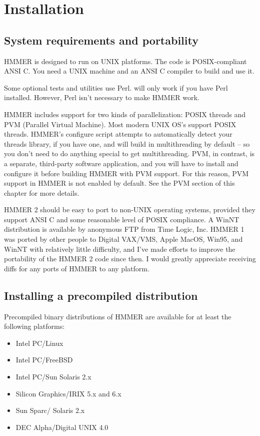 \chapter{Installation}

\section{System requirements and portability}

HMMER is designed to run on UNIX platforms. The code is
POSIX-compliant ANSI C.  You need a UNIX machine and an ANSI C
compiler to build and use it.

Some optional tests and utilities use Perl.  will only
work if you have Perl installed. However, Perl isn't necessary to make
HMMER work.

HMMER includes support for two kinds of parallelization: POSIX threads
and PVM (Parallel Virtual Machine). Most modern UNIX OS's support
POSIX threads. HMMER's configure script attempts to automatically
detect your threads library, if you have one, and will build in
multithreading by default -- so you don't need to do anything special
to get multithreading. PVM, in contrast, is a separate, third-party
software application, and you will have to install and configure it
before building HMMER with PVM support. For this reason, PVM support
in HMMER is not enabled by default. See the PVM section of this
chapter for more details.

HMMER 2 should be easy to port to non-UNIX operating systems, provided
they support ANSI C and some reasonable level of POSIX compliance.  A
WinNT distribution is available by anonymous FTP from Time Logic,
Inc. HMMER 1 was ported by other people to Digital VAX/VMS, Apple
MacOS, Win95, and WinNT with relatively little difficulty, and I've
made efforts to improve the portability of the HMMER 2 code since
then. I would greatly appreciate receiving diffs for any ports of
HMMER to any platform.

\section{Installing a precompiled distribution}

Precompiled binary distributions of HMMER are available for at least
the following platforms:
\begin{itemize}
\item Intel PC/Linux
\item Intel PC/FreeBSD
\item Intel PC/Sun Solaris 2.x
\item Silicon Graphics/IRIX 5.x and 6.x
\item Sun Sparc/ Solaris 2.x
\item DEC Alpha/Digital UNIX 4.0
\end{itemize}

